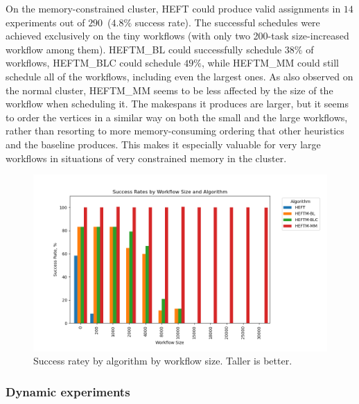 \documentclass[conference]{IEEEtran}
\newcommand{\algo}[1]{\textsc{#1}}
\newcommand{\heft}{\algo{HEFT}\xspace}
\newcommand{\heftmm}{\algo{HEFTM\_MM}\xspace}
\newcommand{\heftbl}{\algo{HEFTM\_BL}\xspace}
\newcommand{\heftblc}{\algo{HEFTM\_BLC}\xspace}
\begin{document}
    On the memory-constrained cluster, \heft could produce valid assignments in $14$ experiments out of $290$~($4.8\%$
    success rate).
    The successful schedules were achieved exclusively on the tiny workflows (with only two 200-task size-increased
    workflow among them).
    \heftbl could successfully schedule $38\%$ of workflows, \heftblc could schedule $49\%$, while \heftmm
    could still schedule all of the workflows, including even the largest ones.
    As also observed on the normal cluster, \heftmm seems to be less affected by the size of the workflow when scheduling
    it.
    The makespans it produces are larger, but it seems to order the vertices in a similar way on both the small and the large workflows,
    rather than resorting to more memory-consuming ordering that other heuristics and the baseline produces.
    This makes it especially valuable for very large workflows in situations of very constrained memory in the cluster.

    \begin{figure}[tb]
        \centering
        \includegraphics[width=1.1\columnwidth] {images/success-rates-tiny}
        \caption{Success ratey by algorithm by workflow size. Taller is better. }
        \label{fig:success-rates-tiny}
        \vspace{-0.3cm}
    \end{figure}

    \subsubsection{Dynamic experiments}
\end{document}
